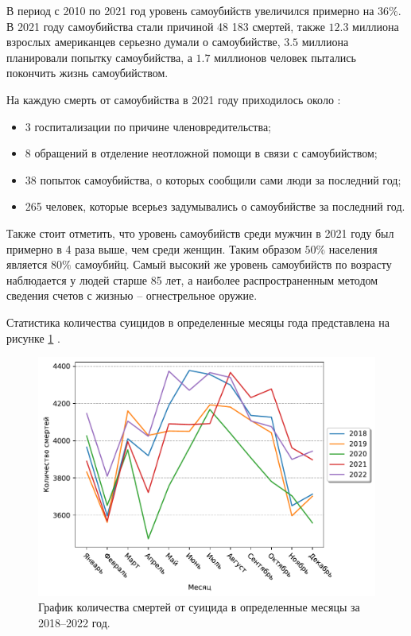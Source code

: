 В период с 2010 по 2021 год уровень самоубийств увеличился примерно на $36\%$. В 2021 году самоубийства стали причиной 48 183 смертей, также $12.3$ миллиона взрослых американцев серьезно думали о самоубийстве, $3.5$ миллиона планировали попытку самоубийства, а $1.7$ миллионов человек пытались покончить жизнь самоубийством. \cite{suicideStats}

На каждую смерть от самоубийства в 2021 году приходилось около \cite{suicideStats}:
\begin{itemize}
	\item 3 госпитализации по причине членовредительства;
	\item 8 обращений в отделение неотложной помощи в связи с самоубийством;
	\item 38 попыток самоубийства, о которых сообщили сами люди за последний год;
	\item 265 человек, которые всерьез задумывались о самоубийстве за последний год. 
\end{itemize}

Также стоит отметить, что уровень самоубийств среди мужчин в 2021 году был примерно в 4 раза выше, чем среди женщин. Таким образом $50\%$ населения является $80\%$ самоубийц. Самый высокий же уровень самоубийств по возрасту наблюдается у людей старше 85 лет, а наиболее распространенным методом сведения счетов с жизнью -- огнестрельное оружие.

Статистика количества суицидов в определенные месяцы года представлена на рисунке \ref{img:cdcsuicides} \cite{suicideStats}.

\begin{figure}[H]
	\centering
	\includegraphics[width=\textwidth]{inc/deathToMonth.pdf}
	\caption{ График количества смертей от суицида в определенные месяцы за 2018--2022 год. }
	\label{img:cdcsuicides}
\end{figure}


